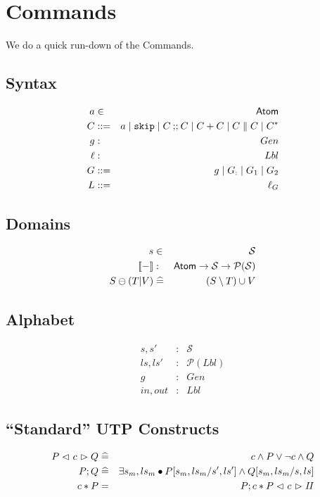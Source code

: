 \section{Commands}

We do a quick run-down of the Commands\cite{conf/popl/Dinsdale-YoungBGPY13}.

\subsection{Syntax}

\begin{eqnarray*}
   a &\in& \textsf{Atom}
\\ C &::=& a \mid \texttt{skip} \mid C \mathbin{;\!;} C \mid C+C \mid C \parallel C \mid C^*
\\ g &:& Gen
\\ \ell &:& Lbl
\\ G &::=&  g \mid G_{:} \mid G_1 \mid G_2
\\ L &::=& \ell_G
\end{eqnarray*}

\subsection{Domains}
\begin{eqnarray*}
   s &\in& \mathcal S
\\ \sem{-} &:& \Atom \fun \mathcal S \fun \mathcal P(\mathcal S)
\\ S \ominus (T|V)
   &\defs& (S \setminus T) \cup V
\end{eqnarray*}

\subsection{Alphabet}

\begin{eqnarray*}
   s, s' &:& \mathcal S
\\ ls, ls' &:& \mathcal P (Lbl)
\\ g &:& Gen
\\ in, out &:& Lbl
\end{eqnarray*}

\subsection{``Standard'' UTP Constructs}

\begin{eqnarray*}
   P \mathrel{\lhd ~ {c} ~ \rhd} Q
   &\mathrel{\widehat=}&
   c \land P \lor \lnot c \land Q
\\ P ; Q
   &\mathrel{\widehat=}&
   \exists s_m,ls_m \bullet P[s_m,ls_m/s',ls'] \land Q[s_m,ls_m/s,ls]
\\ c * P
   &=&
   P ; c * P \mathrel{\lhd ~ {c} ~ \rhd} \mathit{II}
\end{eqnarray*}

